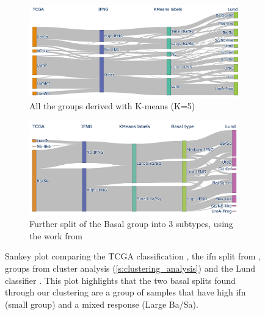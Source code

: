 \begin{figure}[!t]
    \centering
    \begin{subfigure}[!t]{1.0\textwidth}
        \includegraphics[width=1.0\textwidth,keepaspectratio]{Sections/ClusteringAnalysis/Resources/discussion/inf_comp.png}
        \caption{All the groups derived with K-means (K=5)}
        \label{fig:cs:ifn_all}
    \end{subfigure}
    \begin{subfigure}[!t]{1.0\textwidth}
        \includegraphics[width=\textwidth,keepaspectratio]{Sections/ClusteringAnalysis/Resources/discussion/inf_3_basal.png}
        \caption{Further split of the Basal group into 3 subtypes, using the work from \citet{Baker2022-bj}}
        \label{fig:cs:ifn_three_basal}
    \end{subfigure} 
    \caption[MIBC groups comparisons over previous classifications]{Sankey plot comparing the TCGA classification \citep{Robertson2017-mg}, the \acrlong{ifn} split from \citet{Baker2022-bj}, groups from cluster analysis (\cref{s:clustering_analysis}) and the Lund classifier \citep{Marzouka2018-ge}. This plot highlights that the two basal splits found through our clustering are a group of samples that have high \acrshort{ifn} (small group) and a mixed response (Large Ba/Sa). }
    \label{fig:cs:ifn_comp}
\end{figure}


